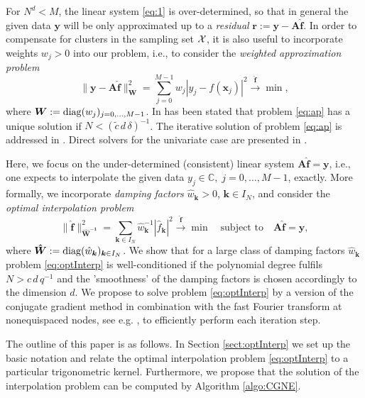 \documentclass[11pt,a4paper,bibtotoc]{scrartcl}
\newcommand{\zb}[1]{\ensuremath{\boldsymbol{#1}}}
\newcommand{\diag}{{\rm diag}}
\newcommand{\indexset}{{I_N}}
\numberwithin{equation}{section}
\numberwithin{table}{section}
\numberwithin{figure}{section}
\begin{document}
For $N^d<M$, the linear system \eqref{eq:1} is over-determined, so that in
general the given data $\zb y$ will be only approximated up to a {\em
  residual} $\zb r:=\zb y-\zb A \zb {\hat f}$. 
In order to compensate for clusters in the sampling set ${\cal X}$, it is also
useful to incorporate weights $w_j> 0$ into our problem, i.e.,
to consider the {\em weighted approximation problem}
\begin{equation}
  \label{eq:ap}
  \|\zb y - \zb A \zb {\hat f}\|_{\zb W}^2
  = \sum_{j=0}^{M-1} w_j |y_j-f(\zb x_j)|^2
  \stackrel{\zb {\hat f}}{\rightarrow} \min,
\end{equation}
where $\zb W:=\diag(w_j)_{j=0,\ldots,M-1}$.
In \cite[Thm. 4.1]{BaGr04} has been stated that problem \eqref{eq:ap} has a
unique solution if $N<(\tilde c \,d \,\delta)^{-1}$.
The iterative solution of problem \eqref{eq:ap} is addressed in
\cite{FeGrSt95,GrSt04}.
Direct solvers for the univariate case are presented in \cite{fas97,ReAmGr}.

Here, we focus on the under-determined (consistent) linear system $\zb A \zb
{\hat f} = \zb y$, i.e., one expects to interpolate the given data $y_j\in
\mathbb{C},\;j=0,\hdots,M-1$, exactly.
More formally, we incorporate {\em damping factors} $\hat w_{\zb k}> 0$, $\zb
k \in I_N$, and
consider the {\em optimal interpolation problem}
\begin{equation}
  \label{eq:optInterp}
  \|\zb {\hat f}\|_{\zb {\hat W^{-1}}}^2
  =\sum_{\zb k\in \indexset} \hat w_{\zb k}^{-1}|\hat f_{\zb k}|^2
  \stackrel{\zb {\hat
      f}}{\rightarrow} \min \quad \text{subject to} \quad \zb A \zb {\hat
    f} = \zb y,
\end{equation}
where $\zb{\hat W}:= \diag(\hat w_{\zb k})_{\zb k\in \indexset}$.
We show that for a large class of damping factors $\hat w_{\zb k}$ problem
\eqref{eq:optInterp} is well-conditioned if the polynomial degree fulfils
$N>c \,d \,q^{-1}$ and the 'smoothness' of the damping factors is chosen
accordingly to the dimension $d$.
We propose to solve problem \eqref{eq:optInterp} by a version of the
conjugate gradient method in combination with the fast Fourier transform at
nonequispaced nodes, see e.g. \cite{st97,postta01,kupo02C}, to efficiently
perform each iteration step.

The outline of this paper is as follows.
In Section \ref{sect:optInterp} we set up the basic notation and relate the
optimal interpolation problem \eqref{eq:optInterp} to a particular
trigonometric kernel.
Furthermore, we propose that the solution of the interpolation problem can be
computed by Algorithm \ref{algo:CGNE}.
\end{document}
